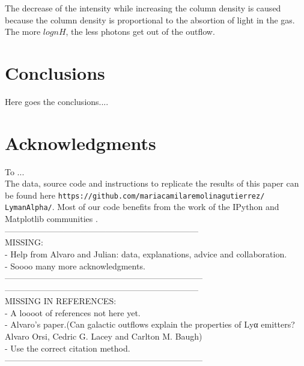 \documentclass{latex/emulateapj}
\begin{document}
The decrease of the intensity while increasing the column density is caused because the column density is proportional to the absortion of light in the gas. The more $log{nH}$, the less photons get out of the outflow.

\section{Conclusions}
\label{sec:conclusions}
Here goes the conclusions....

\section*{Acknowledgments}

To ...\\

The data, source code and instructions to
replicate the results of this paper can be found
here {\texttt{https://github.com/mariacamilaremolinagutierrez/ LymanAlpha/}}.
Most of our code benefits from the work of the IPython and Matplotlib
communities \citep{IPython,matplotlib}.\\

---------------------------------------------------------------------\\
MISSING: \\
- Help from Alvaro and Julian: data, explanations, advice and collaboration. \\
- Soooo many more acknowledgments.\\
-----------------------------------------------------------------------\\

---------------------------------------------------------------------\\
MISSING IN REFERENCES: \\
- A loooot of references not here yet.\\
- Alvaro's paper.(Can galactic outflows explain the properties of Lyα emitters?
Alvaro Orsi, Cedric G. Lacey and Carlton M. Baugh)\\
- Use the correct citation method. \\
-----------------------------------------------------------------------\\




\newpage
\end{document}

